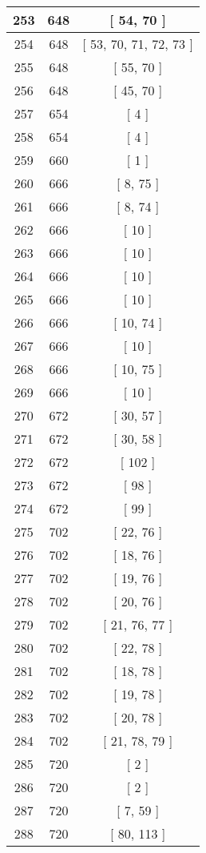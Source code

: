 \begin{center}
\begin{longtable}[H]{|| c c c ||}
253 & 648 & [ 54, 70 ] \\ 
\hline
254 & 648 & [ 53, 70, 71, 72, 73 ] \\ 
\hline
255 & 648 & [ 55, 70 ] \\ 
\hline
256 & 648 & [ 45, 70 ] \\ 
\hline
257 & 654 & [ 4 ] \\ 
\hline
258 & 654 & [ 4 ] \\ 
\hline
259 & 660 & [ 1 ] \\ 
\hline
260 & 666 & [ 8, 75 ] \\ 
\hline
261 & 666 & [ 8, 74 ] \\ 
\hline
262 & 666 & [ 10 ] \\ 
\hline
263 & 666 & [ 10 ] \\ 
\hline
264 & 666 & [ 10 ] \\ 
\hline
265 & 666 & [ 10 ] \\ 
\hline
266 & 666 & [ 10, 74 ] \\ 
\hline
267 & 666 & [ 10 ] \\ 
\hline
268 & 666 & [ 10, 75 ] \\ 
\hline
269 & 666 & [ 10 ] \\ 
\hline
270 & 672 & [ 30, 57 ] \\ 
\hline
271 & 672 & [ 30, 58 ] \\ 
\hline
272 & 672 & [ 102 ] \\ 
\hline
273 & 672 & [ 98 ] \\ 
\hline
274 & 672 & [ 99 ] \\ 
\hline
275 & 702 & [ 22, 76 ] \\ 
\hline
276 & 702 & [ 18, 76 ] \\ 
\hline
277 & 702 & [ 19, 76 ] \\ 
\hline
278 & 702 & [ 20, 76 ] \\ 
\hline
279 & 702 & [ 21, 76, 77 ] \\ 
\hline
280 & 702 & [ 22, 78 ] \\ 
\hline
281 & 702 & [ 18, 78 ] \\ 
\hline
282 & 702 & [ 19, 78 ] \\ 
\hline
283 & 702 & [ 20, 78 ] \\ 
\hline
284 & 702 & [ 21, 78, 79 ] \\ 
\hline
285 & 720 & [ 2 ] \\ 
\hline
286 & 720 & [ 2 ] \\ 
\hline
287 & 720 & [ 7, 59 ] \\ 
\hline
288 & 720 & [ 80, 113 ] \\ 

\end{longtable}
\end{center}
